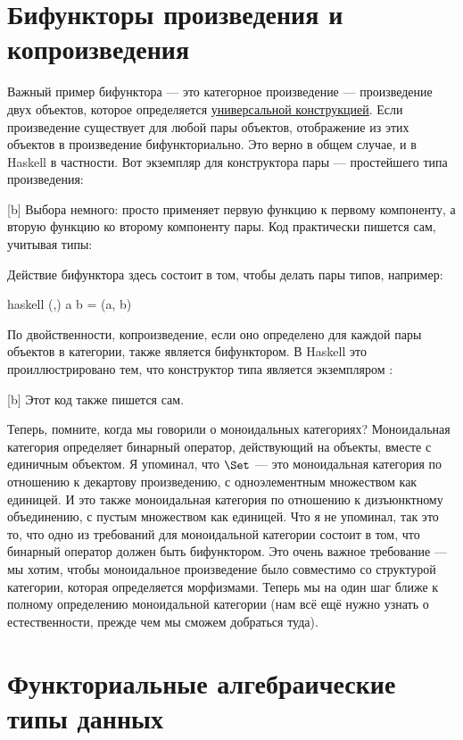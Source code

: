 \section{Бифункторы произведения и копроизведения}

Важный пример бифунктора --- это категорное произведение ---
произведение двух объектов, которое определяется \hyperref[products-and-coproducts]{универсальной
  конструкцией}. Если произведение существует для любой пары объектов,
отображение из этих объектов в произведение бифункториально. Это верно
в общем случае, и в Haskell в частности. Вот экземпляр 
для конструктора пары --- простейшего типа произведения:

[b]
Выбора немного:  просто применяет первую
функцию к первому компоненту, а вторую функцию ко второму
компоненту пары. Код практически пишется сам, учитывая
типы:

Действие бифунктора здесь состоит в том, чтобы делать пары типов, например:

\begin{snip}{haskell}
(,) a b = (a, b)
\end{snip}
По двойственности, копроизведение, если оно определено для каждой пары объектов в
категории, также является бифунктором. В Haskell это проиллюстрировано тем, что
конструктор типа  является экземпляром
:

[b]
Этот код также пишется сам.

Теперь, помните, когда мы говорили о моноидальных категориях? Моноидальная
категория определяет бинарный оператор, действующий на объекты, вместе с
единичным объектом. Я упоминал, что $\Set$ --- это моноидальная категория по
отношению к декартову произведению, с одноэлементным множеством как единицей. И это
также моноидальная категория по отношению к дизъюнктному объединению, с пустым
множеством как единицей. Что я не упоминал, так это то, что одно из требований
для моноидальной категории состоит в том, что бинарный оператор должен быть бифунктором. Это
очень важное требование --- мы хотим, чтобы моноидальное произведение было
совместимо со структурой категории, которая определяется
морфизмами. Теперь мы на один шаг ближе к полному определению
моноидальной категории (нам всё ещё нужно узнать о естественности, прежде чем мы
сможем добраться туда).

\section{Функториальные алгебраические типы данных}

